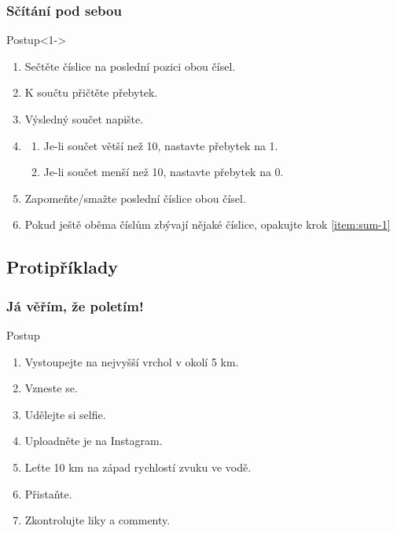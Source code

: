 \documentclass[aspectratio=169,11pt,svgnames,handout]{beamer}
\begin{document}
\begin{frame}
 \frametitle{Sčítání pod sebou}
 \begin{block}{Postup}<1->
  \begin{enumerate}
   \item<2->\label{item:sum-1} Sečtěte číslice na poslední pozici obou čísel.
   \item<3-> K součtu přičtěte přebytek.
   \item<4-> Výsledný součet napište.
   \item<5-> 
    \begin{enumerate}
     \item Je-li součet větší než 10, nastavte přebytek na 1.
     \item Je-li součet menší než 10, nastavte přebytek na 0.
    \end{enumerate}
   \item<6-> Zapomeňte/smažte poslední číslice obou čísel.
   \item<7-> Pokud ještě oběma číslům zbývají nějaké číslice, opakujte krok
    \ref{item:sum-1}
  \end{enumerate}
 \end{block}
\end{frame}

\subsection{Protipříklady}

\begin{frame}
 \subsectionpage
\end{frame}

\begin{frame}
 \frametitle{Já věřím, že poletím!}
 \begin{block}{Postup}
  \begin{enumerate}
   \item Vystoupejte na nejvyšší vrchol v okolí 5 km.
   \item Vzneste se.
   \item Udělejte si selfie.
   \item Uploadněte je na Instagram.
   \item Leťte 10 km na západ rychlostí zvuku ve vodě.
   \item Přistaňte.
   \item Zkontrolujte liky a commenty.
  \end{enumerate}
 \end{block}
\end{frame}
\end{document}
